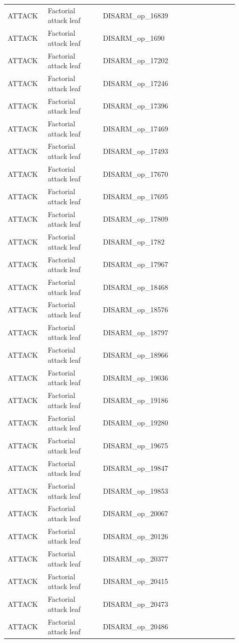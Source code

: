 \begin{table}[htbp]
\begin{threeparttable}
\begin{tabular}{p{0.14\linewidth}p{0.22\linewidth}p{0.54\linewidth}}
ATTACK & Factorial attack leaf & DISARM\_op\_16839 \\
ATTACK & Factorial attack leaf & DISARM\_op\_1690 \\
ATTACK & Factorial attack leaf & DISARM\_op\_17202 \\
ATTACK & Factorial attack leaf & DISARM\_op\_17246 \\
ATTACK & Factorial attack leaf & DISARM\_op\_17396 \\
ATTACK & Factorial attack leaf & DISARM\_op\_17469 \\
ATTACK & Factorial attack leaf & DISARM\_op\_17493 \\
ATTACK & Factorial attack leaf & DISARM\_op\_17670 \\
ATTACK & Factorial attack leaf & DISARM\_op\_17695 \\
ATTACK & Factorial attack leaf & DISARM\_op\_17809 \\
ATTACK & Factorial attack leaf & DISARM\_op\_1782 \\
ATTACK & Factorial attack leaf & DISARM\_op\_17967 \\
ATTACK & Factorial attack leaf & DISARM\_op\_18468 \\
ATTACK & Factorial attack leaf & DISARM\_op\_18576 \\
ATTACK & Factorial attack leaf & DISARM\_op\_18797 \\
ATTACK & Factorial attack leaf & DISARM\_op\_18966 \\
ATTACK & Factorial attack leaf & DISARM\_op\_19036 \\
ATTACK & Factorial attack leaf & DISARM\_op\_19186 \\
ATTACK & Factorial attack leaf & DISARM\_op\_19280 \\
ATTACK & Factorial attack leaf & DISARM\_op\_19675 \\
ATTACK & Factorial attack leaf & DISARM\_op\_19847 \\
ATTACK & Factorial attack leaf & DISARM\_op\_19853 \\
ATTACK & Factorial attack leaf & DISARM\_op\_20067 \\
ATTACK & Factorial attack leaf & DISARM\_op\_20126 \\
ATTACK & Factorial attack leaf & DISARM\_op\_20377 \\
ATTACK & Factorial attack leaf & DISARM\_op\_20415 \\
ATTACK & Factorial attack leaf & DISARM\_op\_20473 \\
ATTACK & Factorial attack leaf & DISARM\_op\_20486 \\

\end{tabular}
\end{threeparttable}
\end{table}
